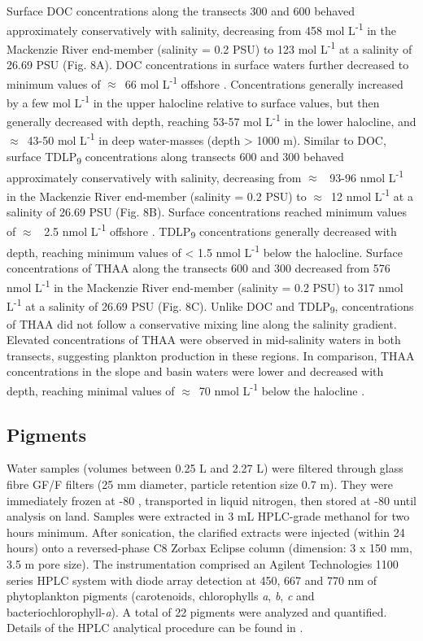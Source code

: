 \documentclass[essd, manuscript]{copernicus}
\begin{document}
Surface DOC concentrations along the transects 300 and 600 behaved approximately conservatively with salinity, decreasing from 458 \textmu mol L\textsuperscript{-1} in the Mackenzie River end-member (salinity = 0.2 PSU) to 123 \textmu mol L\textsuperscript{-1} at a salinity of 26.69 PSU (Fig. 8A). DOC concentrations in surface waters further decreased to minimum values of $\approx$~66 \textmu mol L\textsuperscript{-1} offshore \citep{Fichot2011}. Concentrations generally increased by a few \textmu mol L\textsuperscript{-1} in the upper halocline relative to surface values, but then generally decreased with depth, reaching 53-57 \textmu mol L\textsuperscript{-1} in the lower halocline, and $\approx$~43-50 \textmu mol L\textsuperscript{-1} in deep water-masses (depth > 1000 m). Similar to DOC, surface TDLP\textsubscript{9} concentrations along transects 600 and 300 behaved approximately conservatively with salinity, decreasing from $\approx$~ 93-96 nmol L\textsuperscript{-1} in the Mackenzie River end-member (salinity = 0.2 PSU) to $\approx$~12 nmol L\textsuperscript{-1} at a salinity of 26.69 PSU (Fig. 8B). Surface concentrations reached minimum values of $\approx$~ 2.5 nmol L\textsuperscript{-1} offshore \citep{Fichot2016}. TDLP\textsubscript{9} concentrations generally decreased with depth, reaching minimum values of < 1.5 nmol L\textsuperscript{-1} below the halocline. Surface concentrations of THAA along the transects 600 and 300 decreased from 576 nmol L\textsuperscript{-1} in the Mackenzie River end-member (salinity = 0.2 PSU) to 317 nmol L\textsuperscript{-1} at a salinity of 26.69 PSU (Fig. 8C). Unlike DOC and TDLP\textsubscript{9}, concentrations of THAA did not follow a conservative mixing line along the salinity gradient. Elevated concentrations of THAA were observed in mid-salinity waters in both transects, suggesting plankton production in these regions. In comparison, THAA concentrations in the slope and basin waters were lower and decreased with depth, reaching minimal values of $\approx$~70 nmol L\textsuperscript{-1} below the halocline \citep{Shen2012}.

\subsection{Pigments}

Water samples (volumes between 0.25 L and 2.27 L) were filtered through glass fibre GF/F filters (25 mm diameter, particle retention size 0.7 \textmu m). They were immediately frozen at -80 \textcelsius{}, transported in liquid nitrogen, then stored at -80 \textcelsius{} until analysis on land. Samples were extracted in 3 mL HPLC-grade methanol for two hours minimum. After sonication, the clarified extracts were injected (within 24 hours) onto a reversed-phase C8 Zorbax Eclipse column (dimension: 3 x 150 mm, 3.5 \textmu m pore size). The instrumentation comprised an Agilent Technologies 1100 series HPLC system with diode array detection at 450, 667 and 770 nm of phytoplankton pigments (carotenoids, chlorophylls \textit{a}, \textit{b}, \textit{c} and bacteriochlorophyll-\textit{a}). A total of 22 pigments were analyzed and quantified. Details of the HPLC analytical procedure can be found in \citet{Ras2008}.
\end{document}
